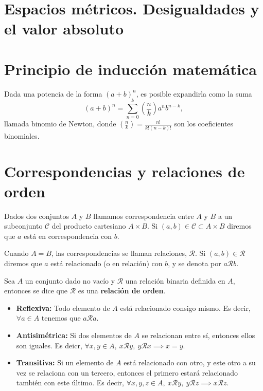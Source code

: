 \section{Espacios métricos. Desigualdades y el valor absoluto}

\section{Principio de inducción matemática}

\begin{theorem}
    Dada una potencia de la forma $\left( a + b \right)^n$, es posible expandirla como la suma
    \begin{equation}
        \left( a + b \right) ^n = \sum_{n=0}^k \left( \frac{n}{k} \right)a^n b^{n - k},
    \end{equation}
    llamada binomio de Newton, donde $\left( \frac{n}{k} \right) = \frac{n!}{k!\left( n - k \right)!}$ son los coeficientes binomiales.
\end{theorem}

\section{Correspondencias y relaciones de orden}
\begin{defi}
    Dados dos conjuntos $A$ y $B$ llamamos correspondencia entre $A$ y $B$ a un subconjunto $\mathcal{C}$ del producto cartesiano $A\times B$. Si $\left( a, b \right) \in\mathcal{C}\subset A\times B$ diremos que $a$ está en correspondencia con $b$.
\end{defi}

\begin{defi}
    Cuando $A = B$, las correspondencias se llaman relaciones, $\mathcal{R}$. Si $\left( a, b \right)\in\mathcal{R} $ diremos que $a$ está relacionado (o en relación) con $b$, y se denota por $a\mathcal{R}b$.
\end{defi}

\begin{defi}
    Sea $A$ un conjunto dado no vacío y $\mathcal{R}$ una relación binaria definida en $A$, entonces se dice que $\mathcal{R}$ es una \textbf{relación de orden}.
    \begin{itemize}[itemsep = -2pt]
        \item\textbf{Reflexiva:} Todo elemento de $A$ está relacionado consigo mismo. Es decir, $\forall a\in A$ tenemos que $a\mathcal{R} a$.
        \item\textbf{Antisimétrica:} Si dos elementos de $A$ se relacionan entre sí, entonces ellos son iguales. Es deicr, $\forall x, y\in A,\ x\mathcal{R} y,\ y\mathcal{R} x \implies x = y$.
        \item\textbf{Transitiva:} Si un elemento de $A$ está relacionado con otro, y este otro a su vez se relaciona con un tercero, entonces el primero estará relacionado también con este último. Es decir, $\forall x, y, z\in A,\ x\mathcal{R} y,\ y\mathcal{R}z\implies x\mathcal{R}z$.
    \end{itemize}
\end{defi}

